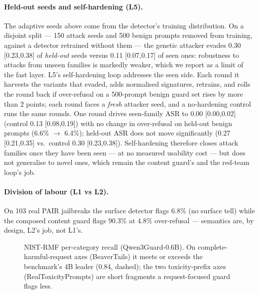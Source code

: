 \documentclass[11pt]{article}
\begin{document}
\paragraph{Held-out seeds and self-hardening (L5).} The adaptive seeds above come from the detector's
training distribution. On a disjoint split --- 150 attack seeds and 500 benign prompts removed from
training, against a detector retrained without them --- the genetic attacker evades 0.30 [0.23,0.38] of
\emph{held-out} seeds versus 0.11 [0.07,0.17] of seen ones: robustness to attacks from unseen families is
markedly weaker, which we report as a limit of the fast layer. L5's self-hardening loop addresses the
seen side. Each round it harvests the variants that evaded, adds normalised signatures, retrains, and rolls
the round back if over-refusal on a 500-prompt benign guard set rises by more than 2 points; each round
faces a \emph{fresh} attacker seed, and a no-hardening control runs the same rounds. One round drives
seen-family ASR to 0.00 [0.00,0.02] (control 0.13 [0.08,0.19]) with no change in over-refusal on held-out
benign prompts (6.6\% $\rightarrow$ 6.4\%); held-out ASR does not move significantly (0.27 [0.21,0.35]
vs.\ control 0.30 [0.23,0.38]). Self-hardening therefore closes attack families once they have been seen
--- at no measured usability cost --- but does not generalise to novel ones, which remain the content
guard's and the red-team loop's job.

\paragraph{Division of labour (L1 vs L2).} On 103 real PAIR jailbreaks the surface detector flags
6.8\% (no surface tell) while the composed content guard flags 90.3\% at 4.8\% over-refusal ---
semantics are, by design, L2's job, not L1's.

\begin{figure}[t]
\centering
{}
\caption{NIST-RMF per-category recall (Qwen3Guard-0.6B). On complete-harmful-request axes
(BeaverTails) it meets or exceeds the benchmark's 4B leader (0.84, dashed); the two toxicity-prefix
axes (RealToxicityPrompts) are short fragments a request-focused guard flags less.}
\label{fig:nist}
\end{figure}
\end{document}
